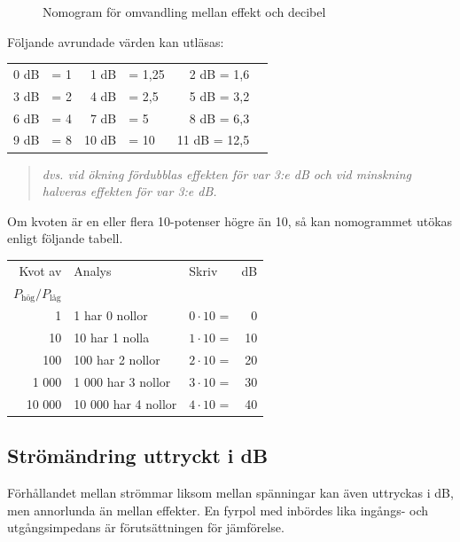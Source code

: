\begin{figure}
  \caption{Nomogram för omvandling mellan effekt och decibel}
  \label{ellära-nomogram-db-effekt}
\end{figure}

Följande avrundade värden kan utläsas:

\begin{tabular}{rlrlrl}
0 dB & = 1 &  1 dB & =  1,25 & 2 dB = 1,6 \\
3 dB & = 2 &  4 dB & =  2,5  & 5 dB = 3,2 \\
6 dB & = 4 &  7 dB & =  5    & 8 dB = 6,3 \\
9 dB & = 8 & 10 dB & = 10    & 11 dB = 12,5
\end{tabular}

\begin{quote}\emph{
dvs. vid ökning fördubblas effekten för var 3:e dB och vid minskning
halveras effekten för var 3:e dB.
}\end{quote}

Om kvoten är en eller flera 10-potenser högre än 10, så kan nomogrammet utökas
enligt följande tabell.

\begin{tabular}{rllr}
Kvot av & Analys             & Skriv            & dB \\
\(P_\text{hög}/P_\text{låg}\) &          &                  &    \\
     1 & 1 har 0 nollor      & \(0 \cdot 10\) = &  0 \\
    10 & 10 har 1 nolla      & \(1 \cdot 10\) = & 10 \\
   100 & 100 har 2 nollor    & \(2 \cdot 10\) = & 20 \\
 1 000 &  1 000 har 3 nollor & \(3 \cdot 10\) = & 30 \\
10 000 & 10 000 har 4 nollor & \(4 \cdot 10\) = & 40
\end{tabular}

\subsection{Strömändring uttryckt i dB}

Förhållandet mellan strömmar liksom mellan spänningar kan även uttryckas i dB,
men annorlunda än mellan effekter.
En fyrpol med inbördes lika ingångs- och utgångsimpedans är förutsättningen för
jämförelse.


